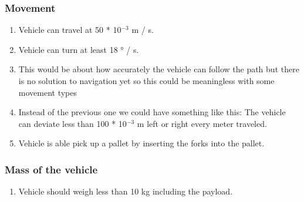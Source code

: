 \documentclass[../report.tex]{subfiles}
\begin{document}
        \subsubsection{Movement}
           \begin{center}
                \begin{enumerate}
                    \item Vehicle can travel at 50 * 10$^{-3}$ m / s.
                    \item Vehicle can turn at least 18 ° / s. %
                    \item This would be about how accurately the vehicle can follow the path but there is no solution to navigation yet so this could be meaningless with some movement types
                    \item Instead of the previous one we could have something like this: The vehicle can deviate less than 100 * 10$^{-3}$ m left or right every meter traveled.
                    \item Vehicle is able pick up a pallet by inserting the forks into the pallet. %
                \end{enumerate}
            \end{center}

        \subsubsection{Mass of the vehicle}
        \begin{center}
            \begin{enumerate}
                \item Vehicle should weigh less than 10 kg including the payload. %
            \end{enumerate}
        \end{center}
\end{document}
